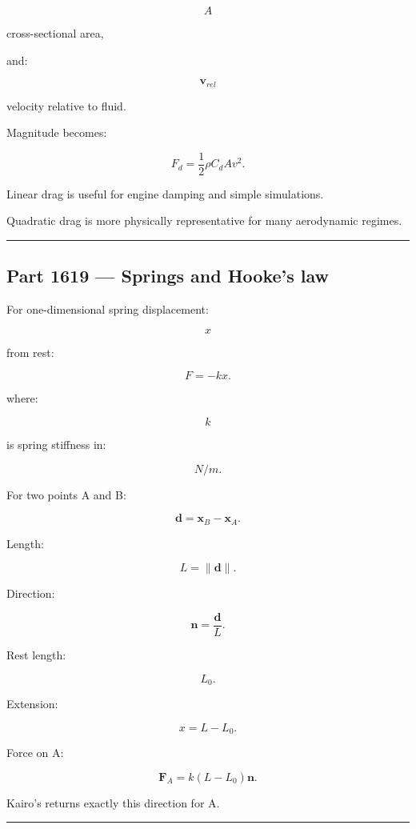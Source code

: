 \[
A
\]

cross-sectional area,

and:

\[
\mathbf{v}_{rel}
\]

velocity relative to fluid.

Magnitude becomes:

\[
F_d
=
\frac12\rho C_d A v^2.
\]

Linear drag is useful for engine damping and simple simulations.

Quadratic drag is more physically representative for many aerodynamic regimes.

\begin{center}\rule{0.5\linewidth}{0.5pt}\end{center}

\subsection{Part 1619 --- Springs and Hooke's law}\label{06-engine-ii-ch034-part-1619-springs-and-hookes-law}

\hypertarget{06-engine-ii-ch034-part-1619-springs-and-hookes-law}{}

For one-dimensional spring displacement:

\[
x
\]

from rest:

\[
\boxed{
F=-kx.
}
\]

where:

\[
k
\]

is spring stiffness in:

\[
N/m.
\]

For two points A and B:

\[
\mathbf{d}
=
\mathbf{x}_B-\mathbf{x}_A.
\]

Length:

\[
L=\|\mathbf{d}\|.
\]

Direction:

\[
\mathbf{n}
=
\frac{\mathbf{d}}{L}.
\]

Rest length:

\[
L_0.
\]

Extension:

\[
x=L-L_0.
\]

Force on A:

\[
\boxed{
\mathbf{F}_A
=
k(L-L_0)\mathbf{n}.
}
\]

Kairo's  returns exactly this direction for A.

\begin{center}\rule{0.5\linewidth}{0.5pt}\end{center}

